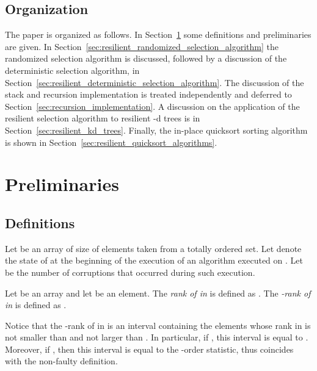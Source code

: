 \documentclass{llncs}
\begin{document}
\subsection{Organization}

The paper is organized as follows.
In Section~\ref{sec:preliminaries} some definitions and preliminaries are given.
In Section~\ref{sec:resilient_randomized_selection_algorithm} the randomized selection algorithm is discussed,
followed by a discussion of the deterministic selection algorithm, in Section~\ref{sec:resilient_deterministic_selection_algorithm}.
The discussion of the stack and recursion implementation is treated independently and deferred to Section~\ref{sec:recursion_implementation}.
A discussion on the application of the resilient selection algorithm to resilient -d trees
is in Section~\ref{sec:resilient_kd_trees}. 
Finally, the in-place quicksort sorting algorithm is shown in Section~\ref{sec:resilient_quicksort_algorithms}.

















\section{Preliminaries}
\label{sec:preliminaries}

\subsection{Definitions}

Let  be an array of size  of elements taken from a totally ordered set. Let  denote the state of  at the beginning of the execution of an algorithm  executed on . Let  be the number of corruptions that occurred during such execution.

\begin{definition}
Let  be an array and let  be an element. The \emph{rank of  in } is defined as . The \emph{-rank of  in } is defined as .
\end{definition}

Notice that the -rank of  in  is an interval containing the elements whose rank in  is not smaller than  and not larger than . In particular, if , this interval is equal to .
Moreover, if , then this interval is equal to the -order statistic, thus coincides with the non-faulty definition.
\end{document}
